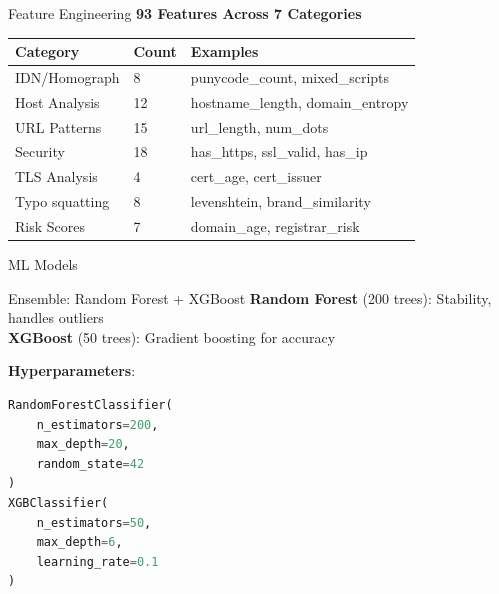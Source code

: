 \documentclass[10pt, aspectratio=169]{beamer}
\begin{document}
\begin{frame}[fragile]{Feature Engineering}
    \textbf{93 Features Across 7 Categories}
    
    \begin{small}
    \begin{tabular}{@{}lll@{}}
        \toprule
        Category & Count & Examples \\
        \midrule
        IDN/Homograph & 8 & punycode\_count, mixed\_scripts \\
        Host Analysis & 12 & hostname\_length, domain\_entropy \\
        URL Patterns & 15 & url\_length, num\_dots \\
        Security & 18 & has\_https, ssl\_valid, has\_ip \\
        TLS Analysis & 4 & cert\_age, cert\_issuer \\
        Typo squatting & 8 & levenshtein, brand\_similarity \\
        Risk Scores & 7 & domain\_age, registrar\_risk \\
        \bottomrule
    \end{tabular}
    \end{small}
\end{frame}

\begin{frame}[fragile]{ML Models}
    \begin{block}{Ensemble: Random Forest + XGBoost}
        \textbf{Random Forest} (200 trees): Stability, handles outliers \\
        \textbf{XGBoost} (50 trees): Gradient boosting for accuracy
    \end{block}
    
    \vspace{3mm}
    \textbf{Hyperparameters}:
    \begin{lstlisting}[language=Python]
RandomForestClassifier(
    n_estimators=200,
    max_depth=20,
    random_state=42
)
XGBClassifier(
    n_estimators=50,
    max_depth=6,
    learning_rate=0.1
)
    \end{lstlisting}
\end{frame}
\end{document}
